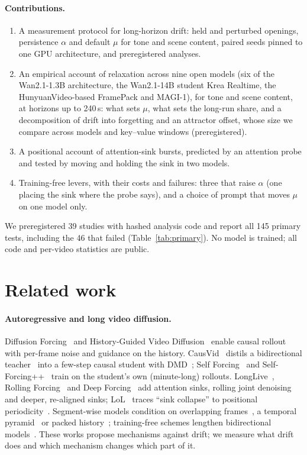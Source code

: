 \documentclass[10pt]{article}
\begin{document}
\paragraph{Contributions.}
\begin{enumerate}
\item A measurement protocol for long-horizon drift: held and perturbed openings, persistence $\alpha$ and default
$\mu$ for tone and scene content, paired seeds pinned to one GPU architecture, and preregistered analyses.
\item An empirical account of relaxation across nine open models (six of the Wan2.1-1.3B architecture, the Wan2.1-14B
student Krea Realtime, the HunyuanVideo-based FramePack and MAGI-1), for tone and scene content, at horizons up to
240\,s: what sets $\mu$, what sets the long-run share, and a decomposition of drift into
forgetting and an attractor offset, whose size we compare across models and key--value windows (preregistered).
\item A positional account of attention-sink bursts, predicted by an attention probe and tested by moving and
holding the sink in two models.
\item Training-free levers, with their costs and failures: three that raise
$\alpha$ (one placing the sink where the probe says), and a choice of prompt that moves $\mu$ on one model only.
\end{enumerate}
We preregistered 39 studies with hashed analysis code and report all 145 primary tests, including the
46 that failed (Table~\ref{tab:primary}). No model is trained; all code and per-video statistics are public.

\section{Related work}
\paragraph{Autoregressive and long video diffusion.} Diffusion Forcing~\cite{diffusionforcing} and History-Guided Video
Diffusion~\cite{historyguided} enable causal rollout with per-frame noise and guidance on the history. CausVid~\cite{causvid}
distils a bidirectional teacher~\cite{wan} into a few-step causal student with DMD~\cite{dmd}; Self
Forcing~\cite{selfforcing} and Self-Forcing++~\cite{selfforcingpp} train on the student's own (minute-long) rollouts.
LongLive~\cite{longlive}, Rolling Forcing~\cite{rollingforcing} and Deep Forcing~\cite{deepforcing} add attention sinks,
rolling joint denoising and deeper, re-aligned sinks; LoL~\cite{lol} traces ``sink collapse'' to positional periodicity~\cite{riflex,roundround}.
Segment-wise models condition on overlapping frames~\cite{skyreels,streamingt2v,magi}, a temporal
pyramid~\cite{pyramidflow} or packed history~\cite{framepack}; training-free schemes lengthen bidirectional
models~\cite{fifo,freenoise,freelong,rollingdiffusion}. These works propose mechanisms against drift; we measure what
drift does and which mechanism changes which part of it.
\end{document}
